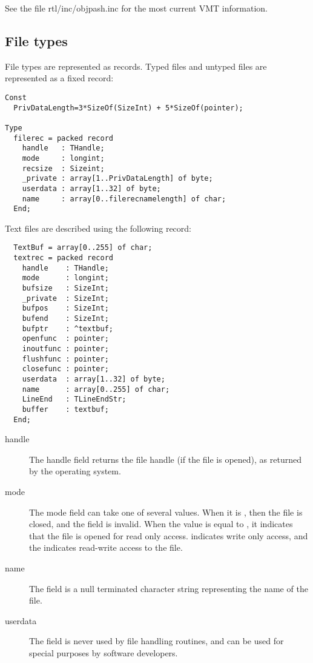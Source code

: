 See the file rtl/inc/objpash.inc for the most current VMT information.

\subsection{File types}

File types are represented as records. Typed files and untyped
files are represented as a fixed record:

\begin{verbatim}
Const
  PrivDataLength=3*SizeOf(SizeInt) + 5*SizeOf(pointer);

Type
  filerec = packed record
    handle   : THandle;
    mode     : longint;
    recsize  : Sizeint;
    _private : array[1..PrivDataLength] of byte;
    userdata : array[1..32] of byte;
    name     : array[0..filerecnamelength] of char;
  End;
\end{verbatim}

Text files are described using the following record:

\begin{verbatim}
  TextBuf = array[0..255] of char;
  textrec = packed record
    handle    : THandle;
    mode      : longint;
    bufsize   : SizeInt;
    _private  : SizeInt;
    bufpos    : SizeInt;
    bufend    : SizeInt;
    bufptr    : ^textbuf;
    openfunc  : pointer;
    inoutfunc : pointer;
    flushfunc : pointer;
    closefunc : pointer;
    userdata  : array[1..32] of byte;
    name      : array[0..255] of char;
    LineEnd   : TLineEndStr;
    buffer    : textbuf;
  End;
\end{verbatim}

\begin{description}
\item[handle] The handle field returns the file handle (if the file is
opened), as returned by the operating system.

\item[mode] The mode field can take one of several values. When it is
, then the file is closed, and the  field is invalid.
When the value is equal to , it indicates that the file is
opened for read only access.  indicates write only access,
and the  indicates read-write access to the file.

\item[name] The  field is a null terminated character string representing
the name of the file.

\item[userdata] The  field is never used by \fpc file handling
routines, and can be used for special purposes by software developers.
\end{description}

